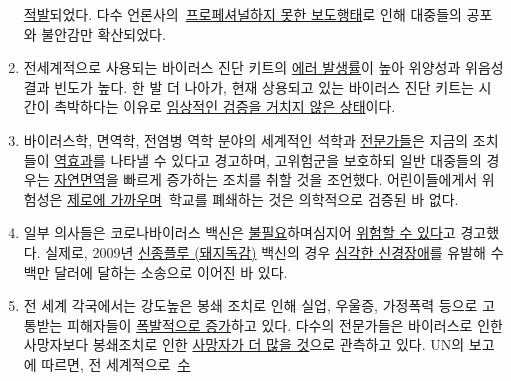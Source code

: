 \begin{enumerate}
  \href{https://nypost.com/2020/04/01/cbs-admits-to-using-footage-from-italy-in-report-about-nyc/}{적발}되었다.
  다수
  언론사의~\href{https://onlinelibrary.wiley.com/doi/full/10.1111/eci.13222}{프로페셔널하지
  못한 보도행태}로 인해 대중들의 공포와 불안감만 확산되었다. 
\item
  전세계적으로 사용되는 바이러스 진단 키트의
  \href{https://www.ncbi.nlm.nih.gov/pubmed/32219885}{에러 발생률}이
  높아 위양성과 위음성 결과 빈도가 높다. 한 발 더 나아가, 현재 상용되고
  있는 바이러스 진단 키트는 시간이 촉박하다는 이유로
  \href{https://www.youtube.com/watch?v=p_AyuhbnPOI}{임상적인 검증을
  거치지 않은 상태}이다.
\item
  바이러스학, 면역학, 전염병 역학 분야의 세계적인 석학과
  \href{https://off-guardian.org/2020/03/24/12-experts-questioning-the-coronavirus-panic/}{전문가들}은
  지금의 조치들이
  \href{https://off-guardian.org/2020/03/28/10-more-experts-criticising-the-coronavirus-panic/}{역효과}를
  나타낼 수 있다고 경고하며, 고위험군을 보호하되 일반 대중들의 경우는
  \href{https://off-guardian.org/2020/04/08/watch-perspectives-on-the-pandemic-2/}{자연면역}을
  빠르게 증가하는 조치를 취할 것을 조언했다. 어린이들에게서 위험성은
  \href{https://www.thelancet.com/journals/lanchi/article/PIIS2352-4642(20)30095-X/fulltext}{제로에
  가까우며}~학교를 폐쇄하는 것은 의학적으로 검증된 바 없다.
\item
  일부 의사들은 코로나바이러스 백신은
  \href{https://www.youtube.com/watch?v=vrL9QKGQrWk}{불필요}하며심지어
  \href{https://www.nature.com/articles/d41586-020-00751-9}{위험할 수
  있다}고 경고했다. 실제로, 2009년
  \href{https://www.forbes.com/2010/02/05/world-health-organization-swine-flu-pandemic-opinions-contributors-michael-fumento.html\#658c006c48e8}{신종플루
  (돼지독감)} 백신의 경우
  \href{https://www.ibtimes.co.uk/brain-damaged-uk-victims-swine-flu-vaccine-get-60-million-compensation-1438572}{심각한
  신경장애}를 유발해 수 백만 달러에 달하는 소송으로 이어진 바 있다.
\item
  전 세계 각국에서는 강도높은 봉쇄 조치로 인해 실업, 우울증, 가정폭력
  등으로 고통받는 피해자들이
  \href{https://www.reuters.com/article/us-health-coronavirus-usa-layoffs/us-weekly-jobless-claims-seen-at-record-high-again-idUSKBN21K0FX}{폭발적으로
  증가}하고 있다. 다수의 전문가들은 바이러스로 인한 사망자보다
  봉쇄조치로 인한
  \href{https://www.nytimes.com/2020/03/20/opinion/coronavirus-pandemic-social-distancing.html}{사망자가
  더 많을 것}으로 관측하고 있다. UN의 보고에 따르면, 전
  세계적으로~\href{https://www.theguardian.com/global-development/2020/apr/21/coronavirus-pandemic-will-cause-famine-of-biblical-proportions}{수
}
\end{enumerate}
